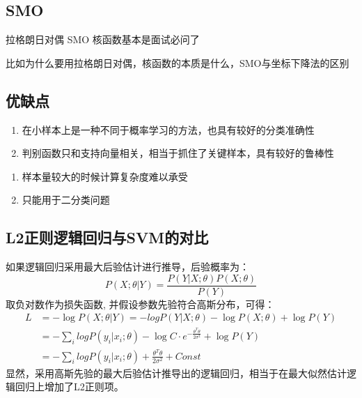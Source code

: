 \subsection{SMO}
拉格朗日对偶
SMO
核函数基本是面试必问了

比如为什么要用拉格朗日对偶，核函数的本质是什么，SMO与坐标下降法的区别

\subsection{优缺点}
{}
\begin{enumerate}
\item 在小样本上是一种不同于概率学习的方法，也具有较好的分类准确性
\item 判别函数只和支持向量相关，相当于抓住了关键样本，具有较好的鲁棒性
\end{enumerate}

{}
\begin{enumerate}
\item 样本量较大的时候计算复杂度难以承受
\item 只能用于二分类问题
\end{enumerate}



\subsection{L2正则逻辑回归与SVM的对比}
如果逻辑回归采用最大后验估计进行推导，后验概率为：
\begin{equation*}
    P(X;\theta|Y) = \frac{P(Y|X;\theta)P(X;\theta)}{P(Y)}
\end{equation*}
取负对数作为损失函数, 并假设参数先验符合高斯分布，可得：
\begin{align*}
    L &= -\log P(X;\theta|Y) = -log P(Y|X;\theta) - \log P(X;\theta) + \log P(Y) \\
    &= -\sum_i log P(y_i|x_i;\theta) - \log C\cdot e^{-\frac{\theta^T\theta}{2\sigma^2}} + \log P(Y) \\
    &= -\sum_i log P(y_i|x_i;\theta) + \frac{\theta^T\theta}{2\sigma^2} + Const
\end{align*}
显然，采用高斯先验的最大后验估计推导出的逻辑回归，相当于在最大似然估计逻辑回归上增加了L2正则项。

